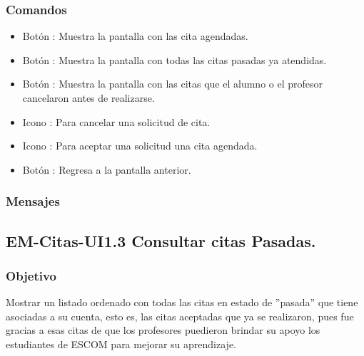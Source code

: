 \subsubsection{Comandos}
	\begin{itemize}
		\item Botón : Muestra la pantalla con las cita agendadas.
		\item Botón : Muestra la pantalla con todas las citas pasadas ya atendidas.
		\item Botón : Muestra la pantalla con las citas que el alumno o el profesor cancelaron antes de realizarse.
		\item Icono : Para cancelar una solicitud de cita.
		\item Icono : Para aceptar una solicitud una cita agendada.
		\item Botón : Regresa a la pantalla anterior.
	\end{itemize}

\subsubsection{Mensajes}
	\begin{Citemize}
		\item {}
	\end{Citemize}

\pagebreak

\subsection{EM-Citas-UI1.3 Consultar citas Pasadas.}

\subsubsection{Objetivo}
	\noindent
	Mostrar un listado ordenado con todas las citas en estado de ''pasada'' que tiene asociadas a su cuenta, esto es, las citas aceptadas que ya se realizaron, pues fue gracias a esas citas de que los profesores puedieron brindar su apoyo los estudiantes de ESCOM para mejorar su aprendizaje.

